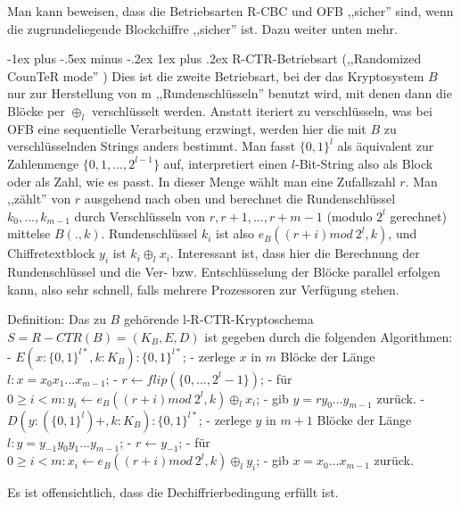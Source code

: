 \documentclass[a4paper]{article}
\makeatletter
\renewcommand{\subsubsection}{\@startsection{subsubsection}{3}{0mm}%
 {-1ex plus -.5ex minus -.2ex}%
 {1ex plus .2ex}%
 {\normalfont\small\bfseries}}
\makeatother
\begin{document}
\begin{multicols}{3}
    Man kann beweisen, dass die Betriebsarten R-CBC und OFB ,,sicher'' sind, wenn die zugrundeliegende Blockchiffre ,,sicher'' ist. Dazu weiter unten mehr.

    \subsubsection{R-CTR-Betriebsart (,,Randomized CounTeR mode'' )}
    Dies ist die zweite Betriebsart, bei der das Kryptosystem $B$ nur zur Herstellung von m ,,Rundenschlüsseln'' benutzt wird, mit denen dann die Blöcke per $\oplus_l$ verschlüsselt werden. Anstatt iteriert zu verschlüsseln, was bei OFB eine sequentielle Verarbeitung erzwingt, werden hier die mit $B$ zu verschlüsselnden Strings anders bestimmt. Man fasst $\{0,1\}^l$ als äquivalent zur Zahlenmenge $\{0,1,...,2^{l-1}\}$ auf, interpretiert einen $l$-Bit-String also als Block oder als Zahl, wie es passt. In dieser Menge wählt man  eine Zufallszahl $r$. Man ,,zählt'' von $r$ ausgehend nach oben und berechnet die Rundenschlüssel $k_0,...,k_{m-1}$ durch Verschlüsseln von $r,r+1,...,r+m-1$ (modulo $2^l$ gerechnet) mittelse $B(.,k)$. Rundenschlüssel $k_i$ ist also $e_B((r+i) mod\ 2^l,k)$, und Chiffretextblock $y_i$ ist $k_i\oplus_l x_i$. Interessant ist, dass hier die Berechnung der Rundenschlüssel und die Ver- bzw. Entschlüsselung der Blöcke parallel erfolgen kann, also sehr schnell, falls mehrere Prozessoren zur Verfügung stehen.

    Definition: Das zu $B$ gehörende l-R-CTR-Kryptoschema $S=R-CTR(B) = (K_B,E,D)$ ist gegeben durch die folgenden Algorithmen:
    - $E(x:\{0,1\}^{l*},k:K_B) :\{0,1\}^{l*}$;
    - zerlege $x$ in $m$ Blöcke der Länge $l:x=x_0 x_1 ...x_{m-1}$;
    - $r\leftarrow flip(\{0,..., 2^l-1\})$;
    - für $0\geq i < m:y_i\leftarrow e_B((r+i) mod\ 2^l,k)\oplus_l x_i$;
    - gib $y=r y_0 ...y_{m-1}$ zurück.
    - $D(y: (\{0,1\}^l)+,k:K_B) :\{0,1\}^{l*}$;
    - zerlege $y$ in $m+1$ Blöcke der Länge $l:y=y_{-1} y_0 y_1 ...y_{m-1}$;
    - $r\leftarrow y_{-1}$;
    - für $0\geq i < m:x_i\leftarrow e_B((r+i) mod\ 2^l,k)\oplus_l y_i$;
    - gib $x=x_0 ...x_{m-1}$ zurück.

    Es ist offensichtlich, dass die Dechiffrierbedingung erfüllt ist.


\end{multicols}
\end{document}
